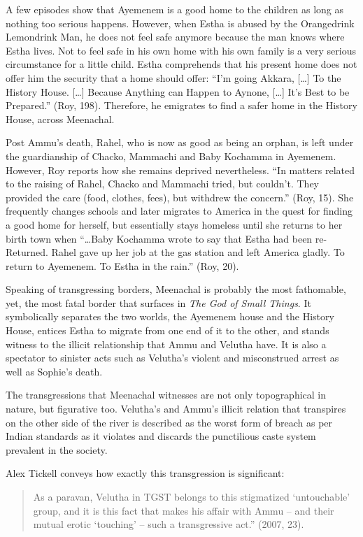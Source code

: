 A few episodes show that Ayemenem is a good home to the children as long as nothing too serious happens. However, when Estha is abused by the Orangedrink Lemondrink Man, he does not feel safe anymore because the man knows where Estha lives. Not to feel safe in his own home with his own family is a very serious circumstance for a little child. Estha comprehends that his present home does not offer him the security that a home should offer: “I’m going Akkara, […] To the History House. […] Because Anything can Happen to Aynone, […] It’s Best to be Prepared.” (Roy, 198). Therefore, he emigrates to find a safer home in the History House, across Meenachal. 

Post Ammu’s death, Rahel, who is now as good as being an orphan, is left under the guardianship of Chacko, Mammachi and Baby Kochamma in Ayemenem. However, Roy reports how she remains deprived nevertheless. “In matters related to the raising of Rahel, Chacko and Mammachi tried, but couldn’t. They provided the care (food, clothes, fees), but withdrew the concern.” (Roy, 15). She frequently changes schools and later migrates to America in the quest for finding a good home for herself, but essentially stays homeless until she returns to her birth town when “\ldots Baby Kochamma wrote to say that Estha had been re-Returned. Rahel gave up her job at the gas station and left America gladly. To return to Ayemenem. To Estha in the rain.” (Roy, 20). 

Speaking of transgressing borders, Meenachal is probably the most fathomable, yet, the most fatal border that surfaces in \emph{The God of Small Things}. It symbolically separates the two worlds, the Ayemenem house and the History House, entices Estha to migrate from one end of it to the other, and stands witness to the illicit relationship that Ammu and Velutha have. It is also a spectator to sinister acts such as Velutha’s violent and misconstrued arrest as well as Sophie’s death. 

The transgressions that Meenachal witnesses are not only topographical in nature, but figurative too. Velutha’s and Ammu’s illicit relation that transpires on the other side of the river is described as the worst form of breach as per Indian standards as it violates and discards the punctilious caste system prevalent in the society. 

Alex Tickell conveys how exactly this transgression is significant:

\begin{quote}
  As a paravan, Velutha in TGST belongs to this stigmatized ‘untouchable’ group, and it is this fact that makes his affair with Ammu – and their mutual erotic ‘touching’ – such a transgressive act.” (2007, 23). 
\end{quote}

